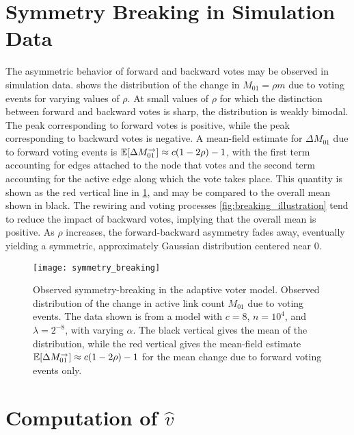 \documentclass[final,supplement,onefignum,onetabnum]{siamart171218}
\begin{document}
\section{Symmetry Breaking in Simulation Data} \label{sec:simulation_symmetry}
    The asymmetric behavior of forward and backward votes may be observed in simulation data. 
     shows the distribution of the change in $M_{01} = \rho m$ due to voting events for varying values of $\rho$. 
    At small values of $\rho$ for which the distinction between forward and backward votes is sharp, the distribution is weakly bimodal. 
    The peak corresponding to forward votes is positive, while the peak corresponding to backward votes is negative. 
    A mean-field estimate for $\Delta M_{01}$ due to forward voting events is $\mathbb{E}[\Delta M^{\rightarrow}_{01}] \approx c(1-2\rho) - 1$, with the first term accounting for edges attached to the node that votes and the second term accounting for the active edge along which the vote takes place. 
    This quantity is shown as the red vertical line in \cref{fig:symmetry_breaking}, and may be compared to the overall mean shown in black.  
    The rewiring and voting processes \cref{fig:breaking_illustration} tend to reduce the impact of backward votes, implying that the overall mean is positive. 
    As $\rho$ increases, the forward-backward asymmetry fades away, eventually yielding a symmetric, approximately Gaussian distribution centered near $0$.  

    \begin{figure}
      \centering
        \texttt{[image: symmetry\_breaking]}
      \caption{
      Observed symmetry-breaking in the adaptive voter model. 
      Observed distribution of the change in active link count $M_{01}$ due to voting events.  
      The data shown is from a model with $c = 8$, $n = 10^4$, and $\lambda = 2^{-8}$, with varying $\alpha$. 
      The black vertical gives the mean of the distribution, while the red vertical gives the mean-field estimate $\mathbb{E}[\Delta M^{\rightarrow}_{01}] \approx c(1-2\rho) - 1$ for the mean change due to forward voting events only. 
      } \label{fig:symmetry_breaking}
    \end{figure}


\section{Computation of $\hat{v}$} \label{sec:calcs}
\end{document}
